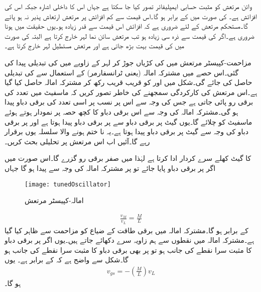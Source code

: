 وائن مرتعش کو مثبت حسابی ایمپلیفائر تصور کیا جا سکتا ہے جہاں  اس کا داخلی اشارہ جبکہ  اس کی افزائش  ہے۔ کی صورت میں  کے برابر ہو گا۔اس قیمت سے کم افزائش پر مرتعش ارتعاش پذیر نہ ہو پائے گا۔مستحکم مرتعش کے لئے ضروری ہے کہ افزائش اس قیمت سے قدر زیادہ ہو۔یوں حقیقت میں  ہونا ضروری ہے۔اگر  کی قیمت  سے ذرہ سی زیادہ ہو تب مرتعش سائن نما لہر خارج کرتا ہے البتہ  کی صورت میں  کی قیمت بہت بڑھ جاتی ہے اور مرتعش مستطیل لہر خارج کرتا ہے۔

 
مزاحمت-کپیسٹر مرتعش میں  کی کڑیاں جوڑ کر لہر کے زاویے میں  کی تبدیلی پیدا کی گئی۔اس حصے میں مشترکہ امالہ (یعنی ٹرانسفارمر) کے استعمال سے  کی تبدیلی حاصل کی جائے گی۔شکل  میں  اور  کو قریب قریب رکھ کر مشترکہ امالہ  حاصل کیا گیا ہے۔اس مرتعش کی کارکردگی سمجھنے کی خاطر تصور کریں کہ ماسفیٹ میں  تعدد کی برقی رو پائی جاتی ہے جس کی وجہ سے اس پر نسب  پر اسی تعدد کی برقی دباو پیدا ہو گی۔مشترکہ امالہ کی وجہ سے  اس برقی دباو کا کچھ حصہ  پر نمودار ہوتے ہوئے ماسفیٹ کو چلائے گا۔یوں گیٹ پر برقی دباو سے  پر برقی دباو پیدا ہوتا ہے اور  پر برقی دباو کی وجہ سے گیٹ پر برقی دباو پیدا ہوتا ہے۔یہ نا ختم ہونے والا سلسلہ یوں برقرار رہے گا۔آئیں اب اس مرتعش پر تحلیلی بحث کریں۔

 کا گیٹ کھلے سرے  کردار ادا کرتا ہے لہٰذا  میں صفر برقی رو گزرے گا۔اس صورت میں اگر  پر برقی دباو  پایا جائے تو  پر مشترکہ امالہ  کی وجہ سے  پیدا ہو گا جہاں
\begin{figure}
\centering
\texttt{[image: tunedOscillator]}
\caption{امالہ-کپیسٹر مرتعش}
\label{شکل_امالہ_کپیسٹر_مرتعش}
\end{figure}
%
\begin{align}
\frac{v_M}{v_L}=\frac{M}{L}
\end{align}
کے برابر ہو گا۔مشترکہ امالہ میں برقی طاقت کے  ضیاع کو مزاحمت  سے ظاہر کیا گیا ہے۔مشترکہ امالہ میں نقطوں سے ہم زاویہ سرے دکھائے جاتے ہیں۔یوں اگر  پر برقی دباو کا مثبت سرا نقطے  کی جانب ہو تو  پر بھی برقی دباو کا مثبت سرا نقطے  کی جانب ہو گا۔شکل سے واضح ہے کہ  کے برابر ہے۔ یوں
\begin{align} \label{مساوات_مشترکہ_برقی_دباو}
v_{gs}=-\left(\frac{M}{L} \right) v_L
\end{align} 
ہو گا۔

